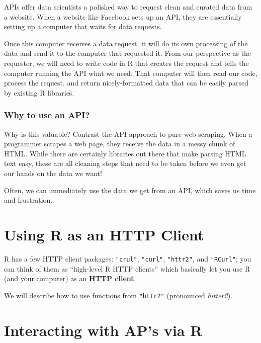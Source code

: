 \documentclass[
]{book}
\begin{document}
APIs offer data scientists a polished way to request clean and curated data
from a website. When a website like Facebook sets up an API, they are
essentially setting up a computer that waits for data requests.

Once this computer receives a data request, it will do its own processing of
the data and send it to the computer that requested it. From our perspective
as the requester, we will need to write code in R that creates the request and
tells the computer running the API what we need. That computer will then read
our code, process the request, and return nicely-formatted data that can be
easily parsed by existing R libraries.

\hypertarget{why-to-use-an-api}{%
\subsubsection*{Why to use an API?}\label{why-to-use-an-api}}

Why is this valuable? Contrast the API approach to pure web scraping. When a
programmer scrapes a web page, they receive the data in a messy chunk of HTML.
While there are certainly libraries out there that make parsing HTML text easy,
these are all cleaning steps that need to be taken before we even get our hands
on the data we want!

Often, we can immediately use the data we get from an API, which saves us time
and frustration.

\hypertarget{using-r-as-an-http-client}{%
\section{Using R as an HTTP Client}\label{using-r-as-an-http-client}}

R has a few HTTP client packages: \texttt{"crul"}, \texttt{"curl"}, \texttt{"httr2"}, and \texttt{"RCurl"};
you can think of them as ``high-level R HTTP clients'' which basically let you
use R (and your computer) as an \textbf{HTTP client}.

We will describe how to use functions from \texttt{"httr2"} (pronounced \emph{hitter2}).

\hypertarget{interacting-with-aps-via-r}{%
\section{Interacting with AP's via R}\label{interacting-with-aps-via-r}}
\end{document}
